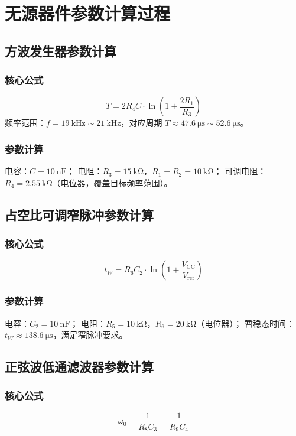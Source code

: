 \documentclass[twoside]{article}
\begin{document}
\section{无源器件参数计算过程}

\subsection{方波发生器参数计算}
\subsubsection{核心公式}
\[ T = 2R_4C \cdot \ln\left(1+\frac{2R_1}{R_3}\right) \]
频率范围：$f=\SI{19}{\kilo\hertz} \sim \SI{21}{\kilo\hertz}$，对应周期 $T\approx \SI{47.6}{\micro\second} \sim \SI{52.6}{\micro\second}$。

\subsubsection{参数计算}
电容：$C=\SI{10}{\nano\farad}$；
电阻：$R_3=\SI{15}{\kilo\ohm}$，$R_1=R_2=\SI{10}{\kilo\ohm}$；
可调电阻：$R_4=\SI{2.55}{\kilo\ohm}$（电位器，覆盖目标频率范围）。
\label{sec:square-generator-calc}

\subsection{占空比可调窄脉冲参数计算}
\subsubsection{核心公式}
\[ t_W = R_6C_2 \cdot \ln\left(1+\frac{V_{\text{CC}}}{V_{\text{ref}}}\right) \]

\subsubsection{参数计算}
电容：$C_2=\SI{10}{\nano\farad}$；
电阻：$R_5=\SI{10}{\kilo\ohm}$，$R_6=\SI{20}{\kilo\ohm}$（电位器）；
暂稳态时间：$t_W \approx \SI{138.6}{\micro\second}$，满足窄脉冲要求。
\label{sec:pulse-calc}

\subsection{正弦波低通滤波器参数计算}
\subsubsection{核心公式}
\[ \omega_0 = \frac{1}{R_8C_3} = \frac{1}{R_9C_4} \]
\end{document}
